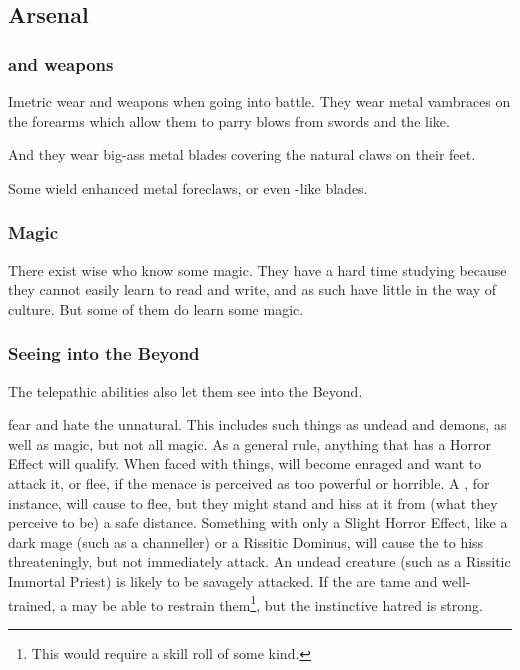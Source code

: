 \subsection{Arsenal}





\subsubsection{\Armour and weapons}
Imetric \nycans{} wear \armour and weapons when going into battle. 
They wear metal vambraces on the forearms which allow them to parry blows from swords and the like. 

And they wear big-ass metal blades covering the natural claws on their feet. 

Some wield enhanced metal foreclaws, or even -like blades. 





\subsubsection{Magic}
There exist wise \nycans{} who know some magic. 
They have a hard time studying because they cannot easily learn to read and write, and as such have little in the way of culture. 
But some of them do learn some  magic. 





\subsubsection{Seeing into the Beyond}
The \pps{\nycans}{} telepathic abilities also let them see into the Beyond. 

\Nycans{} fear and hate the unnatural. 
This includes such things as undead and demons, as well as  magic, but not all magic. 
As a general rule, anything that has a Horror Effect will qualify. 
When faced with  things, \nycans{} will become enraged and want to attack it, or flee, if the menace is perceived as too powerful or horrible. 
A \bane{}, for instance, will cause \nycans{} to flee, but they might stand and hiss at it from (what they perceive to be) a safe distance. 
Something with only a Slight Horror Effect, like a dark mage (such as a \Nieur{} channeller) or a Rissitic Dominus, will cause the \nycans{} to hiss threateningly, but not immediately attack. 
An undead creature (such as a Rissitic Immortal Priest) is likely to be savagely attacked. 
If the \nycans{} are tame and well-trained, a \nycaneer{} may be able to restrain them\footnote{This would require a skill roll of some kind.}, but the instinctive hatred is strong. 

